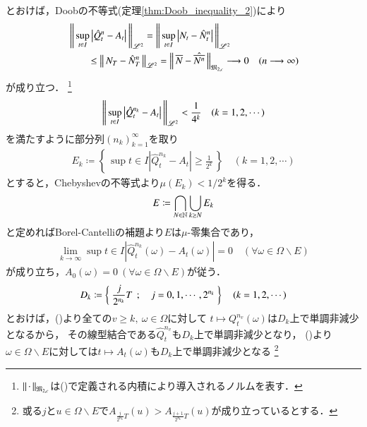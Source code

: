 \begin{prf}
\begin{description}
				とおけば，Doobの不等式(定理\ref{thm:Doob_inequality_2})により
				\begin{align}
					&\left\|\, \operatorname*{sup}_{t \in I} \left| \hat{Q}_t^n - A_t \right|\, \right\|_{\mathscr{L}^2}
					= \left\|\, \operatorname*{sup}_{t \in I} \left| N_t - \hat{N}_t^n \right|\, \right\|_{\mathscr{L}^2} \\
					&\qquad \leq \left\|\, N_T - \hat{N}_T^n\, \right\|_{\mathscr{L}^2}
					= \left\|\, \overline{N} - \hat{\overline{N^n}}\, \right\|_{\mathfrak{M}_{2,c}} \longrightarrow 0 \quad (n \longrightarrow \infty) 
				\end{align}
				が成り立つ．
				\footnote{
					$\left\|\, \cdot\, \right\|_{\mathfrak{M}_{2,c}}$は()で定義される内積により導入されるノルムを表す．
				}
				\begin{align}
					\left\|\, \operatorname*{sup}_{t \in I} \left| \hat{Q}_t^{n_k} - A_t \right|\, \right\|_{\mathscr{L}^2} < \frac{1}{4^k} \quad (k=1,2,\cdots)
				\end{align}
				を満たすように部分列$(n_k)_{k=1}^{\infty}$を取り
				\begin{align}
					E_k \coloneqq \left\{\, \sup{t \in I}{\left| \hat{Q}_t^{n_k} - A_t \right|} \geq \frac{1}{2^k} \, \right\} \quad (k=1,2,\cdots)
				\end{align}
				とすると，Chebyshevの不等式より$\mu(E_k) < 1/2^k$を得る．
				\begin{align}
					E \coloneqq \bigcap_{N \in \mathbb{N}} \bigcup_{k \geq N} E_k
				\end{align}
				と定めればBorel-Cantelliの補題より$E$は$\mu$-零集合であり，
				\begin{align}
					\lim_{k \to \infty}\sup{t \in I}{\left| \hat{Q}_t^{n_k}(\omega) - A_t(\omega) \right|} = 0 
					\quad (\forall \omega \in \Omega \backslash E)
					\label{eq:thm_quadratic_variation_1}
				\end{align}
				が成り立ち，$A_0(\omega) = 0 \ (\forall \omega \in \Omega \backslash E)$が従う．
				\begin{align}
					D_k \coloneqq \left\{\ \frac{j}{2^{n_k}}T\ \, ; \quad  j = 0,1,\cdots,2^{n_k} \ \right\} \quad (k=1,2,\cdots)
				\end{align}
				とおけば，()より全ての$v \geq k,\ \omega \in \Omega$に対して
				$t \longmapsto Q_t^{n_v}(\omega)$は$D_k$上で単調非減少となるから，
				その線型結合である$\hat{Q}_t^{n_v}$も$D_k$上で単調非減少となり，
				()より
				$\omega \in \Omega \backslash E$に対しては$t \longmapsto A_t(\omega)$も$D_k$上で単調非減少となる
				\footnote{
					或る$j$と$u \in \Omega \backslash E$で$A_{\frac{j}{2^{n_k}}T}(u) > A_{\frac{j+1}{2^{n_k}}T}(u)$が成り立っているとする．
}
\end{description}
\end{prf}
